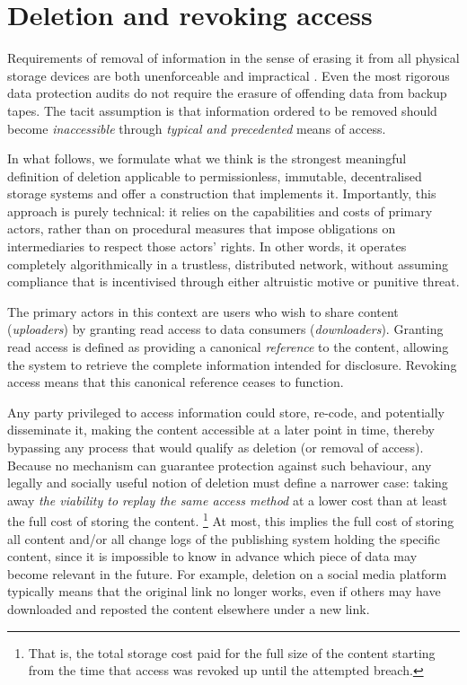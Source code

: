 \documentclass[singlecolumn]{acmart}
\begin{document}
\section{Deletion and revoking access}
\label{sec:deletion}

Requirements of removal of information in the sense of erasing it from all physical storage devices are both unenforceable and impractical \cite{ohm2010broken}. Even the most rigorous data protection audits do not require the erasure of offending data from backup tapes. The tacit assumption is that information ordered to be removed should become \emph{inaccessible} through \emph{typical and precedented} means of access.

In what follows, we formulate what we think is the strongest meaningful definition of deletion applicable to permissionless, immutable, decentralised storage systems and offer a construction that implements it.  Importantly, this approach is purely technical: it relies on the capabilities and costs of primary actors, rather than on procedural measures that impose obligations on intermediaries to respect those actors' rights. In other words, it operates completely algorithmically in a trustless, distributed network, without assuming compliance that is incentivised through either altruistic motive or punitive threat.

The primary actors in this context are users who wish to share content (\emph{uploaders}) by granting read access to data consumers (\emph{downloaders}).  Granting read access is defined as providing a canonical \emph{reference} to the content, allowing the system to retrieve the complete information intended for disclosure. Revoking access means that this canonical reference ceases to function.

Any party privileged to access information could store, re-code, and potentially disseminate it, making the content accessible at a later point in time, thereby bypassing any process that would qualify as deletion (or removal of access). Because no mechanism can  guarantee protection against such behaviour, any legally and socially useful notion of deletion must define a narrower case: taking away \emph{the viability to replay the same access method} at a lower cost than at least the full cost of storing the content.%
%
\footnote{That is, the total storage cost paid for the full size of the content starting from the time that access was revoked up until the attempted breach.}
%
At most, this implies the full cost of storing all content and/or all change logs of the publishing system holding the specific content, since it is impossible to know in advance which piece of data may become relevant in the future.  For example, deletion on a social media platform typically means that the original link no longer works, even if others may have downloaded and reposted the content elsewhere under a new link.%
\end{document}
